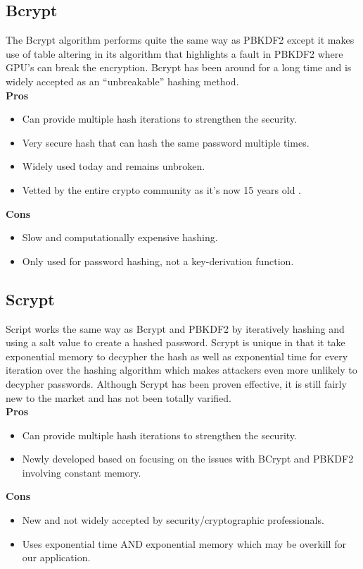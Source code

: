 \documentclass[onecolumn, draftclsnofoot,10pt, compsoc]{IEEEtran}
\begin{document}
\subsection{Bcrypt}
The Bcrypt algorithm performs quite the same way as PBKDF2 except it makes use of table altering in its algorithm that highlights a fault in PBKDF2 where GPU's can break the encryption. Bcrypt has been around for a long time and is widely accepted as an ``unbreakable'' hashing method.\\
\textbf{Pros}
\begin{itemize}
    \item Can provide multiple hash iterations to strengthen the security.
    \item Very secure hash that can hash the same password multiple times.
    \item Widely used today and remains unbroken.
    \item Vetted by the entire crypto community as it’s now 15 years old \cite{medium}.
\end{itemize}
\textbf{Cons} 
\begin{itemize}
    \item Slow and computationally expensive hashing.
    \item Only used for password hashing, not a key-derivation function. 
\end{itemize}
\subsection{Scrypt}
Script works the same way as Bcrypt and PBKDF2 by iteratively hashing and using a salt value to create a hashed password. Scrypt is unique in that it take exponential memory to decypher the hash as well as exponential time for every iteration over the hashing algorithm which makes attackers even more unlikely to decypher passwords. Although Scrypt has been proven effective, it is still fairly new to the market and has not been totally varified.\\
\textbf{Pros}
\begin{itemize}
    \item Can provide multiple hash iterations to strengthen the security.
    \item Newly developed based on focusing on the issues with BCrypt and PBKDF2 involving constant memory.
\end{itemize}
\textbf{Cons}
\begin{itemize}
    \item New and not widely accepted by security/cryptographic professionals.
    \item Uses exponential time AND exponential memory which may be overkill for our application.
\end{itemize}
\end{document}
